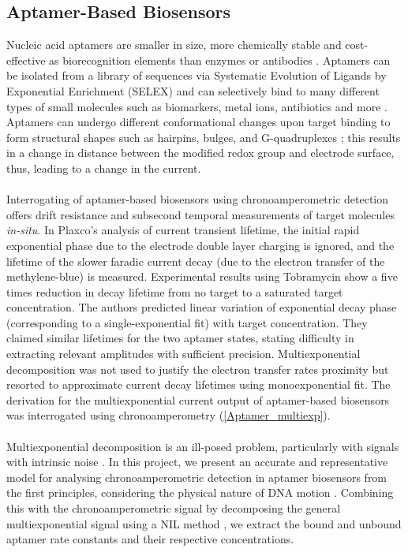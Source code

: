 \subsection{Aptamer-Based Biosensors}
Nucleic acid aptamers are smaller in size, more chemically stable and cost-effective as biorecognition elements than enzymes or antibodies \cite{song2008aptamer}. Aptamers can be isolated from a library of sequences via Systematic Evolution of Ligands by Exponential Enrichment (SELEX) and can selectively bind to many different types of small molecules such as biomarkers, metal ions, antibiotics and more \cite{cai2018investigations}. Aptamers can undergo different conformational changes upon target binding to form structural shapes such as hairpins, bulges, and G-quadruplexes \cite{riccitelli2010computational}; this results in a change in distance between the modified redox group and electrode surface, thus, leading to a change in the current.\\\\
Interrogating of aptamer-based biosensors using chronoamperometric detection offers drift resistance and subsecond temporal measurements of target molecules \textit{in-situ}. In Plaxco's analysis of current transient lifetime, the initial rapid exponential phase due to the electrode double layer charging is ignored, and the lifetime of the slower faradic current decay (due to the electron transfer of the methylene-blue) is measured. Experimental results using Tobramycin show a five times reduction in decay lifetime from no target to a saturated target concentration. The authors predicted linear variation of exponential decay phase (corresponding to a single-exponential fit) with target concentration. They claimed similar lifetimes for the two aptamer states, stating difficulty in extracting relevant amplitudes with sufficient precision. Multiexponential decomposition was not used to justify the electron transfer rates proximity but resorted to approximate current decay lifetimes using monoexponential fit. The derivation for the multiexponential current output of aptamer-based biosensors was interrogated using chronoamperometry (\autoref{Aptamer_multiexp}).\\\\
Multiexponential decomposition is an ill-posed problem, particularly with signals with intrinsic noise \cite{jibia2012appraisal}. In this project, we present an accurate and representative model for analysing chronoamperometric detection in aptamer biosensors from the first principles, considering the physical nature of DNA motion \cite{ouldridge2012coarse}. Combining this with the chronoamperometric signal by decomposing the general multiexponential signal using a NIL method  \cite{provencher1982contin}, we extract the bound and unbound aptamer rate constants and their respective concentrations.\\\\


